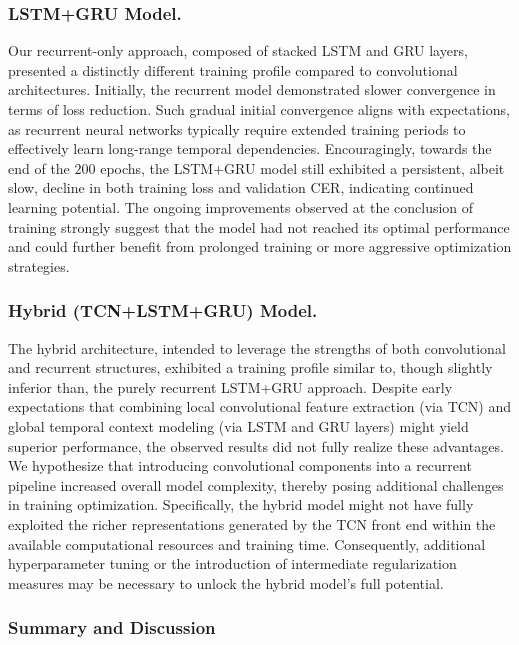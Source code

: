 \subsubsection{LSTM+GRU Model.}

Our recurrent-only approach, composed of stacked LSTM and GRU layers, presented a distinctly different training profile compared to convolutional architectures. Initially, the recurrent model demonstrated slower convergence in terms of loss reduction. Such gradual initial convergence aligns with expectations, as recurrent neural networks typically require extended training periods to effectively learn long-range temporal dependencies. Encouragingly, towards the end of the $200$ epochs, the LSTM+GRU model still exhibited a persistent, albeit slow, decline in both training loss and validation CER, indicating continued learning potential. The ongoing improvements observed at the conclusion of training strongly suggest that the model had not reached its optimal performance and could further benefit from prolonged training or more aggressive optimization strategies.

\subsubsection{Hybrid (TCN+LSTM+GRU) Model.}

The hybrid architecture, intended to leverage the strengths of both convolutional and recurrent structures, exhibited a training profile similar to, though slightly inferior than, the purely recurrent LSTM+GRU approach. Despite early expectations that combining local convolutional feature extraction (via TCN) and global temporal context modeling (via LSTM and GRU layers) might yield superior performance, the observed results did not fully realize these advantages. We hypothesize that introducing convolutional components into a recurrent pipeline increased overall model complexity, thereby posing additional challenges in training optimization. Specifically, the hybrid model might not have fully exploited the richer representations generated by the TCN front end within the available computational resources and training time. Consequently, additional hyperparameter tuning or the introduction of intermediate regularization measures may be necessary to unlock the hybrid model’s full potential.

    
\subsubsection{Summary and Discussion}

